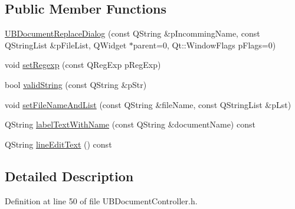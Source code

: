 \subsection*{Public Member Functions}
\begin{DoxyCompactItemize}
\item 
\hyperlink{class_u_b_document_replace_dialog_a50cba28a22932f68178bb48faef79075}{U\-B\-Document\-Replace\-Dialog} (const Q\-String \&p\-Incomming\-Name, const Q\-String\-List \&p\-File\-List, Q\-Widget $\ast$parent=0, Qt\-::\-Window\-Flags p\-Flags=0)
\item 
void \hyperlink{class_u_b_document_replace_dialog_a5bea8ccdbc7f11874f85fd5bc4e86efb}{set\-Regexp} (const Q\-Reg\-Exp p\-Reg\-Exp)
\item 
bool \hyperlink{class_u_b_document_replace_dialog_a362faceaa0a183682f758bca5cb6f1db}{valid\-String} (const Q\-String \&p\-Str)
\item 
void \hyperlink{class_u_b_document_replace_dialog_a03e5d3cfcdd55332304e1134fa31f23b}{set\-File\-Name\-And\-List} (const Q\-String \&file\-Name, const Q\-String\-List \&p\-Lst)
\item 
Q\-String \hyperlink{class_u_b_document_replace_dialog_ab54149dfad0f3f6f03397ea301b5fb14}{label\-Text\-With\-Name} (const Q\-String \&document\-Name) const 
\item 
Q\-String \hyperlink{class_u_b_document_replace_dialog_ae71a9035e30fb34b56630ef0c82e8b42}{line\-Edit\-Text} () const 
\end{DoxyCompactItemize}


\subsection{Detailed Description}


Definition at line 50 of file U\-B\-Document\-Controller.\-h.



